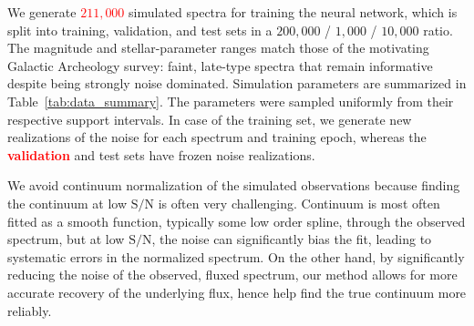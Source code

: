 \documentclass[twocolumn]{aastex7}
\newcommand{\ld}[1]{\textcolor{red}{\textbf{#1}}}
\newcommand{\SNR}{\mathrm{S}/\mathrm{N}}
\begin{document}
We generate \ld{$211{,}000$} simulated spectra for training the neural network, which is split into training, validation, and test sets in a  $200{,}000$ / $1{,}000$ / $10{,}000$ ratio. The magnitude and stellar-parameter ranges match those of the motivating Galactic Archeology survey: faint, late-type spectra that remain informative despite being strongly noise dominated. Simulation parameters are summarized in Table~\ref{tab:data_summary}. The parameters were sampled uniformly from their respective support intervals. In case of the training set, we generate new realizations of the noise for each spectrum and training epoch, whereas the \ld{validation} and test sets have frozen noise realizations.

We avoid continuum normalization of the simulated observations because finding the continuum at low $\SNR$ is often very challenging. Continuum is most often fitted as a smooth function, typically some low order spline, through the observed spectrum, but at low $\SNR$, the noise can significantly bias the fit, leading to systematic errors in the normalized spectrum. On the other hand, by significantly reducing the noise of the observed, fluxed spectrum, our method allows for more accurate recovery of the underlying flux, hence help find the true continuum more reliably.
\end{document}
